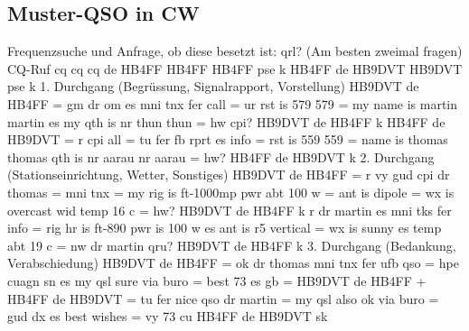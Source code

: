\subsection{Muster-QSO in CW}
Frequenzsuche und Anfrage, ob diese besetzt ist:
qrl?  (Am besten zweimal fragen)
CQ-Ruf
cq cq cq de HB4FF HB4FF HB4FF pse k
HB4FF de HB9DVT HB9DVT  pse k
1. Durchgang (Begrüssung, Signalrapport, Vorstellung)
HB9DVT de HB4FF =
gm dr om es mni tnx fer call =
ur rst is 579 579 = 
my name is martin martin es my qth is nr thun thun =
hw cpi? HB9DVT de HB4FF k
HB4FF de HB9DVT =
r cpi all =
tu fer fb rprt es info =
rst is 559 559 =
name is thomas thomas qth is nr aarau nr aarau =
hw? HB4FF de HB9DVT k
2. Durchgang (Stationseinrichtung, Wetter, Sonstiges)
HB9DVT de HB4FF =
r vy gud cpi dr thomas =
mni tnx =
my rig is ft-1000mp pwr abt 100 w =
ant is dipole =
wx is overcast wid temp 16 c =
hw? HB9DVT de HB4FF k
r dr martin es mni tks fer info =
rig hr is ft-890 pwr is 100 w es ant is r5 vertical =
wx is sunny es temp abt 19 c =
nw dr martin qru? HB9DVT de HB4FF k
3. Durchgang (Bedankung, Verabschiedung)
HB9DVT de HB4FF =
ok dr thomas mni tnx fer ufb qso =
hpe cuagn sn es my qsl sure via buro =
best 73 es gb = HB9DVT de HB4FF +
HB4FF de HB9DVT =
tu fer nice qso dr martin =
my qsl also ok via buro =
gud dx es best wishes =
vy 73 cu HB4FF de HB9DVT sk


